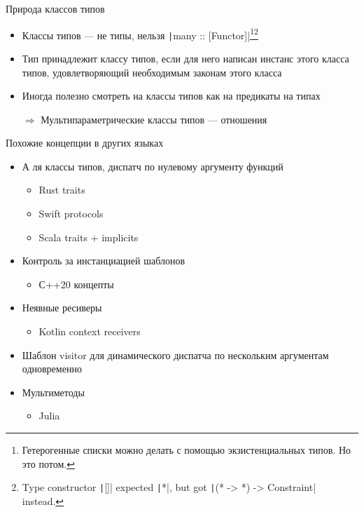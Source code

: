    \begin{frame}[fragile]{Природа классов типов}
        \begin{itemize}
            \item \pause Классы типов --- не типы, нельзя \texttt|many :: [Functor]|\footnote{Гетерогенные списки можно делать с помощью экзистенциальных типов. Но это потом.}\footnote{\advanced Type constructor \texttt|[]| expected \texttt|*|, but got \texttt|(* -> *) -> Constraint| instead.}
            \item \pause Тип принадлежит классу типов, если для него написан инстанс этого класса типов, удовлетворяющий необходимым законам этого класса
            \item \pause Иногда полезно смотреть на классы типов как на предикаты на типах
            \item[$\Rightarrow$] Мультипараметрические классы типов --- отношения
        \end{itemize}
    \end{frame}

    \begin{frame}[fragile]{Похожие концепции в других языках \popslide}
        \begin{itemize}
            \item А ля классы типов, диспатч по нулевому аргументу функций
            \begin{itemize}
                \item Rust traits
                \item Swift protocols
                \item Scala traits + implicits
            \end{itemize}
            \item Контроль за инстанциацией шаблонов
            \begin{itemize}
                \item С++20 концепты
            \end{itemize}
            \item Неявные ресиверы
            \begin{itemize}
                \item Kotlin context receivers
            \end{itemize}
            \item Шаблон visitor для динамического диспатча по нескольким аргументам одновременно
            \item Мультиметоды
            \begin{itemize}
                \item Julia
            \end{itemize}
        \end{itemize}
    \end{frame}


